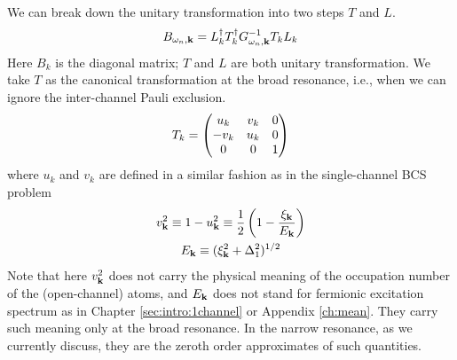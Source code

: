 We  can break down the unitary transformation into two steps $T$ and $L$. 
\begin{equation}\label{eq:pathInt2:B}
B_{\omega_{n},\mathbf{k}}=L_k^{\dagger}T_k^{\dagger}G_{\omega_{n},\mathbf{k}}^{-1}T_kL_k
\end{equation} 
Here $B_{k}$ is the diagonal matrix; $T$ and $L$ are both unitary transformation.  We take $T$ as the canonical transformation at the broad resonance, i.e., when we can ignore the inter-channel Pauli exclusion. 
\begin{equation}\label{eq:pathInt2:T}
T_k=\begin{pmatrix}u_k&v_k&0\\-v_k&u_k&0\\0&0&1\end{pmatrix}
\end{equation}	
where $u_{k}$ and $v_{k}$ are defined in a similar fashion as in the single-channel BCS  problem
\begin{gather}
v_{\mathbf{k}}^{2}\equiv1-u_{\mathbf{k}}^{2}\equiv\frac{1}{2}\left(1-\frac{\xi_{\mathbf{k}}}{E_{\mathbf{k}}}\right)\\
E_{\mathbf{k}}\equiv(\xi_{\mathbf{k}}^{2}+\Delta_{1}^{2})^{1/2}
\end{gather}
Note that here $v_{\mathbf{k}}^{2}$  does not carry the physical meaning of the occupation number of the (open-channel) atoms, and $E_{\mathbf{k}}$   does not stand for fermionic excitation spectrum as in Chapter \ref{sec:intro:1channel} or Appendix \ref{ch:mean}.   They carry such meaning only  at the broad resonance. In the narrow resonance, as we currently discuss, they are the zeroth order approximates of such quantities. 

